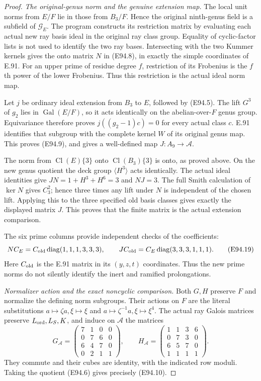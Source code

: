 \begin{proof}
\emph{The original-genus norm and the genuine extension map.}
The local unit norms from \(E/F\) lie in those
from \(B_3/F\). Hence the original ninth-genus
field is a subfield of \(\mathcal G_E\).
The program constructs its restriction matrix
by evaluating each actual new ray basis ideal
in the original ray class group. Equality of
cyclic-factor lists is not used to identify
the two ray bases.
Intersecting with the two Kummer kernels gives
the onto matrix \(N\) in (E94.8), in exactly
the simple coordinates of E.91. For an upper
prime of residue degree \(f\), restriction of
its Frobenius is the \(f\)th power of the
lower Frobenius. Thus this restriction is
the actual ideal norm map.

Let \(j\) be ordinary ideal extension from
\(B_3\) to \(E\), followed by (E94.5).
The lift \(G^3\) of \(g_2\) lies in
\(\operatorname{Gal}(E/F)\), so it acts
identically on the abelian-over-\(F\) genus
group. Equivariance therefore proves
\(j((g_2-1)c)=0\) for every actual class \(c\).
E.91 identifies that subgroup with the
complete kernel \(W\) of its original genus
map. This proves (E94.9), and gives a
well-defined map \(J:A_9\to\mathcal A\).

The norm from \(\operatorname{Cl}(E)\{3\}\)
onto \(\operatorname{Cl}(B_3)\{3\}\) is onto,
as proved above. On the new genus quotient
the deck group \(\langle H^3\rangle\) acts
identically. The actual ideal identities give
\(JN=1+H^3+H^6=3\) and \(NJ=3\).
The full Smith calculation of \(\ker N\)
gives \(C_3^2\); hence three times any lift
under \(N\) is independent of the chosen
lift. Applying this to the three specified
old basis classes gives exactly the displayed
matrix \(J\). This proves that the finite
matrix is the actual extension comparison.

The six prime columns provide independent
checks of the coefficients:
\[
 NC_E=C_{\rm old}\operatorname{diag}(1,1,1,3,3,3),
 \qquad
 JC_{\rm old}=C_E\operatorname{diag}(3,3,3,1,1,1).
 \tag{E94.19}
\]
Here \(C_{\rm old}\) is the E.91 matrix in
its \((y,z,t)\) coordinates. Thus the new
prime norms do not silently identify the
inert and ramified prolongations.

\emph{Normalizer action and the exact noncyclic comparison.}
Both \(G,H\) preserve \(F\) and normalize
the defining norm subgroups. Their actions
on \(F\) are the literal substitutions
\(a\mapsto\zeta a,\xi\mapsto\xi\) and
\(a\mapsto\zeta^{-1}a,\xi\mapsto\xi^4\).
The actual ray Galois matrices preserve
\(L_{\rm ord},L_S,K\), and induce on
\(\mathcal A\) the matrices
\[
 G_{\mathcal A}=
 \begin{pmatrix}7&1&0&0\\0&7&6&0\\6&4&7&0\\0&2&1&1\end{pmatrix},
 \qquad
 H_{\mathcal A}=
 \begin{pmatrix}1&1&3&6\\0&7&3&0\\6&5&7&0\\1&1&1&1\end{pmatrix}.
 \tag{E94.20}
\]
They commute and their cubes are identity,
with the indicated row moduli. Taking the
quotient (E94.6) gives precisely (E94.10).


\end{proof}
